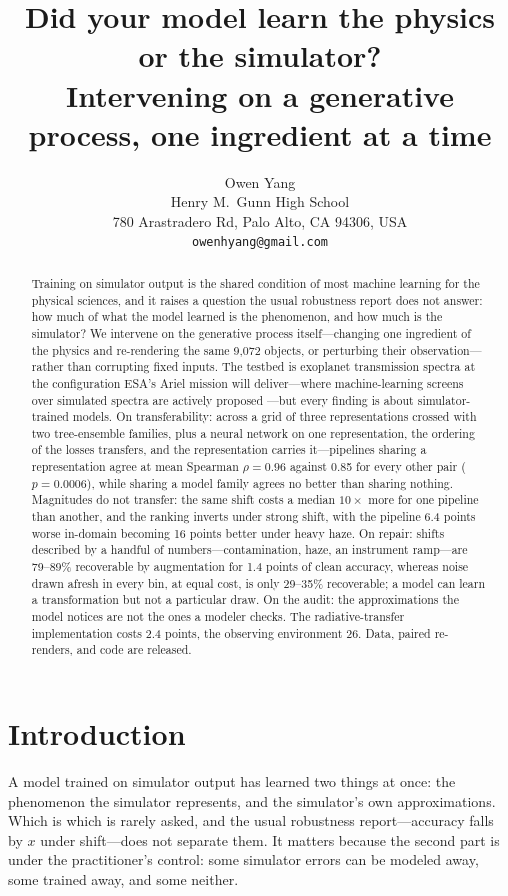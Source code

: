 \documentclass{article}
\title{Did your model learn the physics or the simulator?\\Intervening on a generative process, one ingredient at a time}
\author{%
  Owen Yang\\
  Henry M.\ Gunn High School\\
  780 Arastradero Rd, Palo Alto, CA 94306, USA\\
  \texttt{owenhyang@gmail.com}\\
}
\begin{document}
\maketitle

\begin{abstract}
Training on simulator output is the shared condition of most machine learning for the physical sciences, and it raises a question the usual robustness report does not answer: how much of what the model learned is the phenomenon, and how much is the simulator? We intervene on the generative process itself---changing one ingredient of the physics and re-rendering the same 9,072 objects, or perturbing their observation---rather than corrupting fixed inputs. The testbed is exoplanet transmission spectra at the configuration ESA's Ariel mission \citep{tinetti2018} will deliver---where machine-learning screens over simulated spectra are actively proposed \citep{marquezneila2018,duquecastano2025,yip2023}---but every finding is about simulator-trained models. On transferability: across a grid of three representations crossed with two tree-ensemble families, plus a neural network on one representation, the ordering of the losses transfers, and the representation carries it---pipelines sharing a representation agree at mean Spearman $\rho = 0.96$ against 0.85 for every other pair ($p = 0.0006$), while sharing a model family agrees no better than sharing nothing. Magnitudes do not transfer: the same shift costs a median $10\times$ more for one pipeline than another, and the ranking inverts under strong shift, with the pipeline 6.4 points worse in-domain becoming 16 points better under heavy haze. On repair: shifts described by a handful of numbers---contamination, haze, an instrument ramp---are 79--89\% recoverable by augmentation for 1.4 points of clean accuracy, whereas noise drawn afresh in every bin, at equal cost, is only 29--35\% recoverable; a model can learn a transformation but not a particular draw. On the audit: the approximations the model notices are not the ones a modeler checks. The radiative-transfer implementation costs 2.4 points, the observing environment 26. Data, paired re-renders, and code are released.
\end{abstract}

\section{Introduction}

A model trained on simulator output has learned two things at once: the phenomenon the simulator represents, and the simulator's own approximations. Which is which is rarely asked, and the usual robustness report---accuracy falls by $x$ under shift---does not separate them. It matters because the second part is under the practitioner's control: some simulator errors can be modeled away, some trained away, and some neither.
\end{document}
